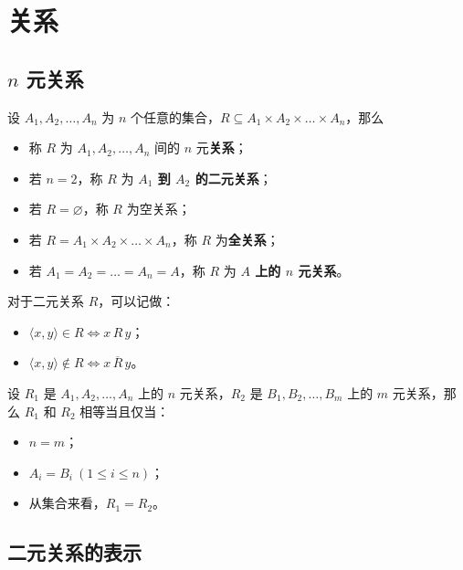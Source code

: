 \section{关系}

\subsection{$n$ 元关系}

\begin{definition}[关系]
    设 $A_1, A_2, \dots, A_n$ 为 $n$ 个任意的集合，$R \subseteq A_1 \times A_2 \times \dots \times A_n$，那么
    \begin{itemize}
        \item 称 $R$ 为 $A_1, A_2, \dots, A_n$ 间的 $n$ 元\textbf{关系}；
        \item 若 $n = 2$，称 $R$ 为 \textbf{$A_1$ 到 $A_2$ 的二元关系}；
        \item 若 $R = \varnothing$，称 $R$ 为空关系；
        \item 若 $R = A_1 \times A_2 \times \dots \times A_n$，称 $R$ 为\textbf{全关系}；
        \item 若 $A_1 = A_2 = \dots = A_n = A$，称 $R$ 为 \textbf{$A$ 上的 $n$ 元关系}。
    \end{itemize}
\end{definition}

对于二元关系 $R$，可以记做：
\begin{itemize}
    \item $\langle x, y \rangle \in R \iff x \, R \, y$；
    \item $\langle x, y \rangle \notin R \iff x \, \overline{R} \, y$。
\end{itemize}

\begin{definition}[关系的相等]
    设 $R_1$ 是 $A_1, A_2, \dots, A_n$ 上的 $n$ 元关系，$R_2$ 是 $B_1, B_2, \dots, B_m$ 上的 $m$ 元关系，那么 $R_1$ 和 $R_2$ 相等当且仅当：
    \begin{itemize}
        \item $n = m$；
        \item $A_i = B_i\ (1 \le i \le n)$；
        \item 从集合来看，$R_1 = R_2$。
    \end{itemize}
\end{definition}

\subsection{二元关系的表示}

